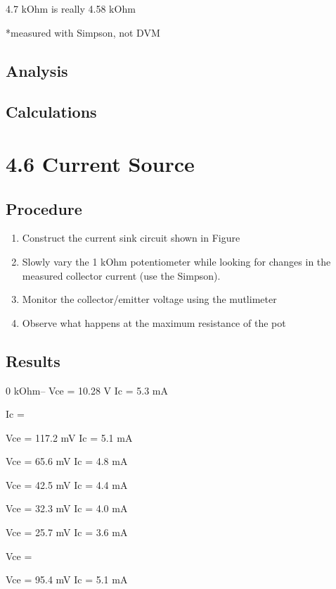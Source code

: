 \documentclass[12pt,letterpaper]{report}
\begin{document}
4.7 kOhm is really 4.58 kOhm

*measured with Simpson, not DVM

\subsection*{Analysis}


\subsection*{Calculations}

\section*{4.6 Current Source}
\subsection*{Procedure}

\begin{enumerate}
\item Construct the current sink circuit shown in Figure %
\item Slowly vary the 1 kOhm potentiometer while looking for changes in the measured collector current (use the Simpson).
\item Monitor the collector/emitter voltage using the mutlimeter
\item Observe what happens at the maximum resistance of the pot
\end{enumerate}

\subsection*{Results}

%
%
%

0 kOhm--
Vce = 10.28 V
Ic = 5.3 mA

Ic = 

Vce = 117.2 mV
Ic = 5.1 mA

Vce = 65.6  mV
Ic = 4.8 mA

Vce = 42.5 mV
Ic = 4.4 mA

Vce = 32.3 mV
Ic = 4.0 mA

Vce = 25.7 mV
Ic = 3.6 mA

Vce = 

Vce = 95.4 mV
Ic = 5.1 mA
\end{document}

